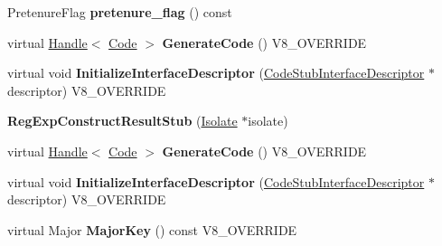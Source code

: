 \begin{DoxyCompactItemize}
\item 
\hypertarget{classv8_1_1internal_1_1_v8___f_i_n_a_l_ab665a915fb3f2ed151813c92fef3337e}{}Pretenure\+Flag {\bfseries pretenure\+\_\+flag} () const \label{classv8_1_1internal_1_1_v8___f_i_n_a_l_ab665a915fb3f2ed151813c92fef3337e}

\item 
\hypertarget{classv8_1_1internal_1_1_v8___f_i_n_a_l_a0ed5719f94df27f3b0c610b0a4934a70}{}virtual \hyperlink{classv8_1_1internal_1_1_handle}{Handle}$<$ \hyperlink{classv8_1_1internal_1_1_code}{Code} $>$ {\bfseries Generate\+Code} () V8\+\_\+\+O\+V\+E\+R\+R\+I\+D\+E\label{classv8_1_1internal_1_1_v8___f_i_n_a_l_a0ed5719f94df27f3b0c610b0a4934a70}

\item 
\hypertarget{classv8_1_1internal_1_1_v8___f_i_n_a_l_aedb89fb967acc9802a2789257d456f13}{}virtual void {\bfseries Initialize\+Interface\+Descriptor} (\hyperlink{classv8_1_1internal_1_1_code_stub_interface_descriptor}{Code\+Stub\+Interface\+Descriptor} $\ast$descriptor) V8\+\_\+\+O\+V\+E\+R\+R\+I\+D\+E\label{classv8_1_1internal_1_1_v8___f_i_n_a_l_aedb89fb967acc9802a2789257d456f13}

\item 
\hypertarget{classv8_1_1internal_1_1_v8___f_i_n_a_l_aa80145a05041b65f669fb9f68d742496}{}{\bfseries Reg\+Exp\+Construct\+Result\+Stub} (\hyperlink{classv8_1_1internal_1_1_isolate}{Isolate} $\ast$isolate)\label{classv8_1_1internal_1_1_v8___f_i_n_a_l_aa80145a05041b65f669fb9f68d742496}

\item 
\hypertarget{classv8_1_1internal_1_1_v8___f_i_n_a_l_a0ed5719f94df27f3b0c610b0a4934a70}{}virtual \hyperlink{classv8_1_1internal_1_1_handle}{Handle}$<$ \hyperlink{classv8_1_1internal_1_1_code}{Code} $>$ {\bfseries Generate\+Code} () V8\+\_\+\+O\+V\+E\+R\+R\+I\+D\+E\label{classv8_1_1internal_1_1_v8___f_i_n_a_l_a0ed5719f94df27f3b0c610b0a4934a70}

\item 
\hypertarget{classv8_1_1internal_1_1_v8___f_i_n_a_l_aedb89fb967acc9802a2789257d456f13}{}virtual void {\bfseries Initialize\+Interface\+Descriptor} (\hyperlink{classv8_1_1internal_1_1_code_stub_interface_descriptor}{Code\+Stub\+Interface\+Descriptor} $\ast$descriptor) V8\+\_\+\+O\+V\+E\+R\+R\+I\+D\+E\label{classv8_1_1internal_1_1_v8___f_i_n_a_l_aedb89fb967acc9802a2789257d456f13}

\item 
\hypertarget{classv8_1_1internal_1_1_v8___f_i_n_a_l_ae50db15936b838b4fcfbc1995bf37ad5}{}virtual Major {\bfseries Major\+Key} () const V8\+\_\+\+O\+V\+E\+R\+R\+I\+D\+E\label{classv8_1_1internal_1_1_v8___f_i_n_a_l_ae50db15936b838b4fcfbc1995bf37ad5}


\end{DoxyCompactItemize}

